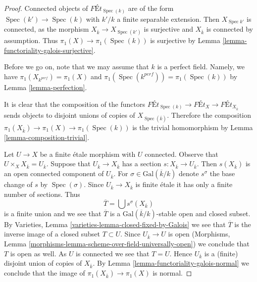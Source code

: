 \documentclass{stacks-project}
\theoremstyle{plain}
\theoremstyle{definition}
\theoremstyle{remark}
\numberwithin{equation}{subsection}
\def\Spec{\mathop{\mathrm{Spec}}}
\begin{document}
\begin{proof}
Connected objects of $\textit{F\'Et}_{\Spec(k)}$ are of the form
$\Spec(k') \to \Spec(k)$ with $k'/k$ a finite separable extension.
Then $X_{\Spec{k'}}$ is connected, as the morphism
$X_{\overline{k}} \to X_{\Spec(k')}$ is surjective and
$X_{\overline{k}}$ is connected by assumption. Thus
$\pi_1(X) \to \pi_1(\Spec(k))$ is surjective by
Lemma \ref{lemma-functoriality-galois-surjective}.

\medskip\noindent
Before we go on, note that we may assume that $k$ is a perfect field.
Namely, we have $\pi_1(X_{k^{perf}}) = \pi_1(X)$ and
$\pi_1(\Spec(k^{perf})) = \pi_1(\Spec(k))$ by Lemma \ref{lemma-perfection}.

\medskip\noindent
It is clear that the composition of the functors
$\textit{F\'Et}_{\Spec(k)} \to \textit{F\'Et}_X \to
\textit{F\'Et}_{X_{\overline{k}}}$ sends objects to disjoint unions
of copies of $X_{\Spec(\overline{k})}$. Therefore the composition
$\pi_1(X_{\overline{k}}) \to \pi_1(X) \to \pi_1(\Spec(k))$
is the trivial homomorphism by Lemma \ref{lemma-composition-trivial}.

\medskip\noindent
Let $U \to X$ be a finite \'etale morphism with $U$ connected.
Observe that $U \times_X X_{\overline{k}} = U_{\overline{k}}$.
Suppose that $U_{\overline{k}} \to X_{\overline{k}}$
has a section $s : X_{\overline{k}} \to U_{\overline{k}}$.
Then $s(X_{\overline{k}})$ is an open connected component of
$U_{\overline{k}}$. For $\sigma \in \text{Gal}(\overline{k}/k)$
denote $s^\sigma$ the base change of $s$ by $\Spec(\sigma)$.
Since $U_{\overline{k}} \to X_{\overline{k}}$ is finite \'etale
it has only a finite number of sections. Thus
$$
\overline{T} = \bigcup s^\sigma(X_{\overline{k}})
$$
is a finite union and we see that $\overline{T}$ is a
$\text{Gal}(\overline{k}/k)$-stable open and closed subset.
By Varieties, Lemma \ref{varieties-lemma-closed-fixed-by-Galois}
we see that $\overline{T}$ is the inverse image of a closed
subset $T \subset U$. Since $U_{\overline{k}} \to U$ is open
(Morphisms, Lemma \ref{morphisms-lemma-scheme-over-field-universally-open})
we conclude that $T$ is open as well. As $U$ is connected we
see that $T = U$. Hence $U_{\overline{k}}$ is a (finite) disjoint
union of copies of $X_{\overline{k}}$. By
Lemma \ref{lemma-functoriality-galois-normal} we conclude that the image of
$\pi_1(X_{\overline{k}}) \to \pi_1(X)$ is normal.


\end{proof}
\end{document}
